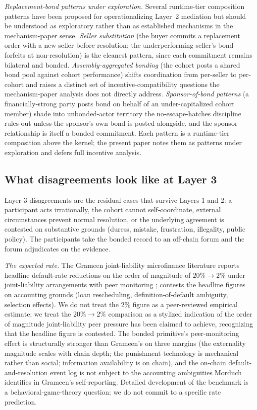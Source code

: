 \documentclass[11pt,a4paper]{article}
\theoremstyle{remark}
\begin{document}
\emph{Replacement-bond patterns under exploration.} Several
runtime-tier composition patterns have been proposed for
operationalizing Layer~2 mediation but should be understood as
exploratory rather than as established mechanisms in the
mechanism-paper sense. \emph{Seller substitution} (the buyer
commits a replacement order with a new seller before
resolution; the underperforming seller's bond forfeits at
non-resolution) is the cleanest pattern, since each commitment
remains bilateral and bonded. \emph{Assembly-aggregated bonding}
(the cohort posts a shared bond pool against cohort performance)
shifts coordination from per-seller to per-cohort and raises a
distinct set of incentive-compatibility questions the
mechanism-paper analysis does not directly address.
\emph{Sponsor-of-bond patterns} (a financially-strong party
posts bond on behalf of an under-capitalized cohort member)
shade into unbonded-actor territory the no-escape-hatches
discipline rules out unless the sponsor's own bond is
posted alongside, and the sponsor relationship is itself a
bonded commitment. Each pattern is a runtime-tier composition
above the kernel; the present paper notes them as patterns
under exploration and defers full incentive analysis.

\subsection{What disagreements look like at Layer 3}

Layer 3 disagreements are the residual cases that survive
Layers 1 and 2: a participant acts irrationally, the cohort cannot
self-coordinate, external circumstances prevent normal resolution,
or the underlying agreement is contested on substantive grounds
(duress, mistake, frustration, illegality, public policy). The
participants take the bonded record to an off-chain forum and the
forum adjudicates on the evidence.

\emph{The expected rate.} The Grameen joint-liability microfinance
literature reports headline default-rate reductions on the order
of magnitude of $20\% \to 2\%$ under joint-liability
arrangements with peer monitoring \citep{grameen1999};
\citet{morduch_1999} contests the headline figures on accounting
grounds (loan rescheduling, definition-of-default ambiguity,
selection effects). We do not treat the $2\%$ figure as a
peer-reviewed empirical estimate; we treat the
$20\% \to 2\%$ comparison as a stylized indication of the order
of magnitude joint-liability peer pressure has been claimed to
achieve, recognizing that the headline figure is contested. The
bonded primitive's peer-monitoring effect is structurally
stronger than Grameen's on three margins (the externality
magnitude scales with chain depth; the punishment technology
is mechanical rather than social; information availability is
on chain), and the on-chain default-and-resolution event log is
not subject to the accounting ambiguities Morduch identifies in
Grameen's self-reporting. Detailed development of the benchmark
is a behavioral-game-theory question; we do not commit to a
specific rate prediction.
\end{document}

